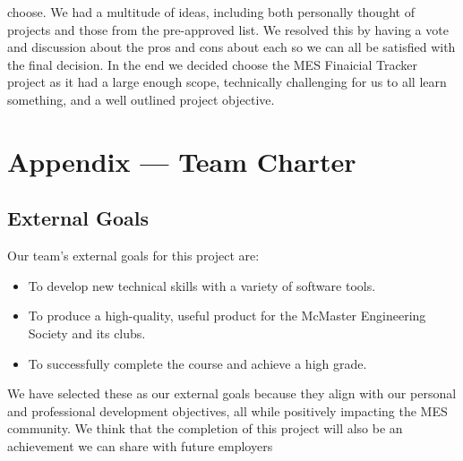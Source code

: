 \documentclass{article}
\begin{document}
\begin{enumerate}
\begin{enumerate}
\begin{enumerate}
        choose. We had a multitude of ideas, including both personally thought of projects and those from the 
        pre-approved list. We resolved this by having a vote and discussion about the pros and cons about each
        so we can all be satisfied with the final decision. In the end we decided choose the MES Finaicial Tracker 
        project as it had a large enough scope, technically challenging for us to all learn something, and a well 
        outlined project objective. 
      \end{enumerate}
\end{enumerate}



\newpage{}

\section*{Appendix --- Team Charter}


\subsection*{External Goals}


Our team's external goals for this project are:
\begin{itemize}
  \item To develop new technical skills with a variety of software tools.
  \item To produce a high-quality, useful product for the McMaster Engineering Society and its clubs.
  \item To successfully complete the course and achieve a high grade.
\end{itemize}

We have selected these as our external goals because they align with our personal and professional development objectives, all while positively impacting the MES community. We think that the completion of this project will also be an achievement we can share with future employers



\end{enumerate}
\end{document}

